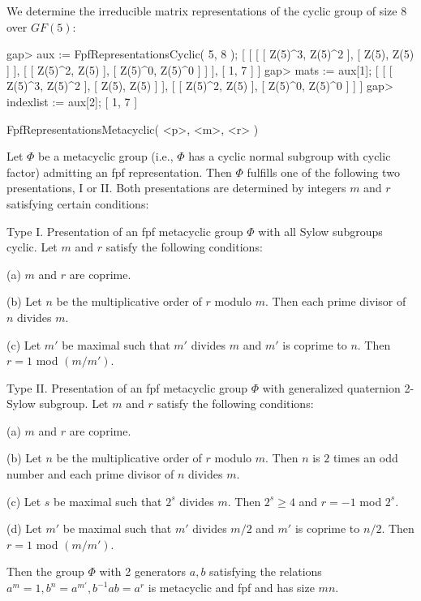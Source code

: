We determine the irreducible matrix representations of the cyclic group of
size 8 over $GF(5)$:

\beginexample
    gap> aux := FpfRepresentationsCyclic( 5, 8 );
    [ [ [ [ Z(5)^3, Z(5)^2 ], [ Z(5), Z(5) ] ], 
          [ [ Z(5)^2, Z(5) ], [ Z(5)^0, Z(5)^0 ] ] ], [ 1, 7 ] ]
    gap> mats := aux[1];
    [ [ [ Z(5)^3, Z(5)^2 ], [ Z(5), Z(5) ] ], 
      [ [ Z(5)^2, Z(5) ], [ Z(5)^0, Z(5)^0 ] ] ]
    gap> indexlist := aux[2];
    [ 1, 7 ]
\endexample
 
\>FpfRepresentationsMetacyclic( <p>, <m>, <r> )

 Let $\Phi$ be a metacyclic group (i.e., $\Phi$ has a cyclic normal subgroup
 with cyclic factor) admitting an fpf representation. Then $\Phi$
 fulfills one of the following two presentations, I or II. Both presentations
 are determined by integers $m$ and $r$ satisfying certain conditions:
 
 Type I. Presentation of an fpf metacyclic group $\Phi$ with all
 Sylow subgroups cyclic.
 Let $m$ and $r$ satisfy the following conditions: 

\beginlist
\item{(a)} $m$ and $r$ are coprime. 
\item{(b)} Let $n$ be the multiplicative order of $r$ modulo $m$.
 Then each prime divisor of $n$ divides $m$.
\item{(c)} Let $m'$ be maximal such that $m'$ divides $m$ and $m'$ is coprime
 to $n$. Then $r = 1$ mod $(m/m')$.
\endlist

 Type II. Presentation of an fpf metacyclic group $\Phi$ with
 generalized quaternion 2-Sylow subgroup.
 Let $m$ and $r$ satisfy the following conditions: 

\beginlist
\item{(a)} $m$ and $r$ are coprime. 
\item{(b)} Let $n$ be the multiplicative order of $r$ modulo $m$.
 Then $n$ is $2$ times an odd number and each prime divisor of $n$ divides $m$.
\item{(c)} Let $s$ be maximal such that $2^s$ divides $m$. Then $2^s\geq 4$
 and $r = -1$ mod $2^s$. 
\item{(d)} Let $m'$ be maximal such that $m'$ divides $m/2$ and $m'$ is
 coprime to $n/2$. Then $r = 1$ mod $(m/m')$. 
\endlist

 Then the group $\Phi$ with 2 generators $a,b$ satisfying the relations
 $a^m = 1, b^n = a^{m'}, b^{-1}ab = a^r$
 is metacyclic and fpf and has size $mn$.

